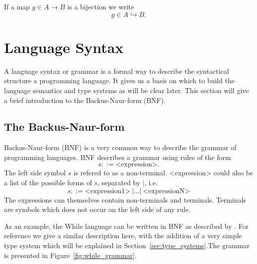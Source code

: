\begin{notation}
  If a map $g\in A \to B$ is a bijection we write
  \begin{equation*}
    g \in A \hookrightarrow B.
  \end{equation*}
\end{notation}


\section{Language Syntax} \label{sec:language_syntax}

A language syntax or grammar is a formal way to describe the syntactical
structure a programming language. It gives us a basis on which to build the
language semantics and type systems as will be clear later. This section will
give a brief introduction to the Backus-Naur-form (BNF).

\subsection{The Backus-Naur-form} \label{sub:the_backus_naur_form} 

Backus-Naur-form (BNF) is a very common way to describe the grammar of
programming languages. BNF describes a grammar using rules of the form
\begin{equation*}
  s ::= \text{<expression>}.
\end{equation*}
The left side symbol $s$ is refered to as a non-terminal. <expression> could
also be a list of the
possible forms of $s$, separated by $|$, i.e. 
\begin{equation*}
  s ::= \text{<expression1>} \: | \dots | \: \text{<expressionN>}
\end{equation*}
The expressions can themselves contain non-terminals and terminals.
Terminals are symbols which does not occur on the left side of any rule.

As an example, the While language can be written in BNF as described
by \textcite{nielson2007semantics}. For reference we give a similar description
here, with the addition of a very simple type system which will be explained in
Section~\ref{sec:type_systems}.The grammar is presented in
Figure~\ref{fig:while_grammar}.


